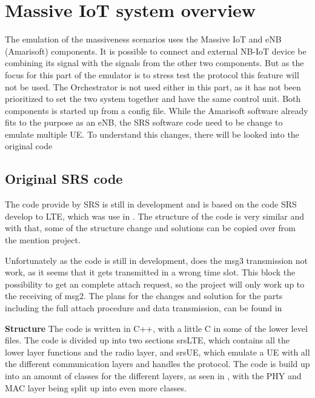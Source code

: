 \chapter{Massive IoT system overview}

The emulation of the massiveness scenarios uses the Massive IoT and eNB (Amarisoft) components. It is possible to connect and external NB-IoT device be combining its signal with the signals from the other two components. But as the focus for this part of the emulator is to stress test the protocol this feature will not be used. The Orchestrator is not used either in this part, as it has not been prioritized to set the two system together and have the same control unit. Both components is started up from a config file. While the Amarisoft software already fits to the purpose as an eNB, the SRS software code need to be change to emulate multiple UE. To understand this changes, there will be looked into the original code

\section{Original SRS code}
The code provide by SRS is still in development and is based on the code SRS develop to LTE, which was use in . The structure of the code is very similar and with that, some of the structure change and solutions can be copied over from the mention project.

Unfortunately as the code is still in development, does the msg3 transmission not work, as it seems that it gets transmitted in a wrong time slot.  This block the possibility to get an complete attach request, so the project will only work up to the receiving of msg2. The plans for the changes and solution for the parts including the full attach procedure and data transmission, can be found in 

\textbf{Structure}
The code is written in C++, with a little C in some of the lower level files. The code is divided up into two sections srsLTE, which contains all the lower layer functions and the radio layer, and srsUE, which emulate a UE with all the different communication layers and handles the protocol. The code is build up into an amount of classes for the different layers, as seen in , with the PHY and MAC layer being split up into even more classes.

